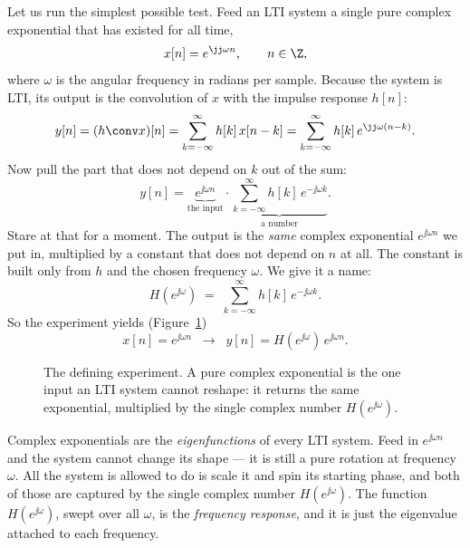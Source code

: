 Let us run the simplest possible test. Feed an LTI system a single pure complex
exponential that has existed for all time,
\[
  x[n] = e^{\jj \omega n}, \qquad n \in \Z,
\]
where $\omega$ is the angular frequency in radians per sample. Because the
system is LTI, its output is the convolution of $x$ with the impulse response
$h[n]$:
\[
  y[n] = (h \conv x)[n]
       = \sum_{k=-\infty}^{\infty} h[k]\, x[n-k]
       = \sum_{k=-\infty}^{\infty} h[k]\, e^{\jj \omega (n-k)}.
\]
Now pull the part that does not depend on $k$ out of the sum:
\[
  y[n] = \underbrace{e^{\jj \omega n}}_{\text{the input}}
         \cdot \underbrace{\sum_{k=-\infty}^{\infty} h[k]\, e^{-\jj \omega k}}_{\text{a number}} .
\]
Stare at that for a moment. The output is the \emph{same} complex exponential
$e^{\jj\omega n}$ we put in, multiplied by a constant that does not depend on
$n$ at all. The constant is built only from $h$ and the chosen frequency
$\omega$. We give it a name:
\begin{equation}
  H(e^{\jj\omega}) \;=\; \sum_{k=-\infty}^{\infty} h[k]\, e^{-\jj \omega k}.
  \label{ch14:Hdef}
\end{equation}
So the experiment yields (Figure~\ref{ch14:fig-eigen})
\begin{equation}
  x[n] = e^{\jj\omega n} \;\;\longrightarrow\;\; y[n] = H(e^{\jj\omega})\, e^{\jj\omega n}.
  \label{ch14:eigenrelation}
\end{equation}

\begin{figure}[H]
\centering
{}
\caption{The defining experiment. A pure complex exponential is the one input an
LTI system cannot reshape: it returns the same exponential, multiplied by the
single complex number $H(e^{\jj\omega})$.}
\label{ch14:fig-eigen}
\end{figure}

\begin{happeningbox}
Complex exponentials are the \emph{eigenfunctions} of every LTI system. Feed in
$e^{\jj\omega n}$ and the system cannot change its shape --- it is still a pure
rotation at frequency $\omega$. All the system is allowed to do is scale it and
spin its starting phase, and both of those are captured by the single complex
number $H(e^{\jj\omega})$. The function $H(e^{\jj\omega})$, swept over all
$\omega$, is the \emph{frequency response}, and it is just the eigenvalue
attached to each frequency.
\end{happeningbox}

